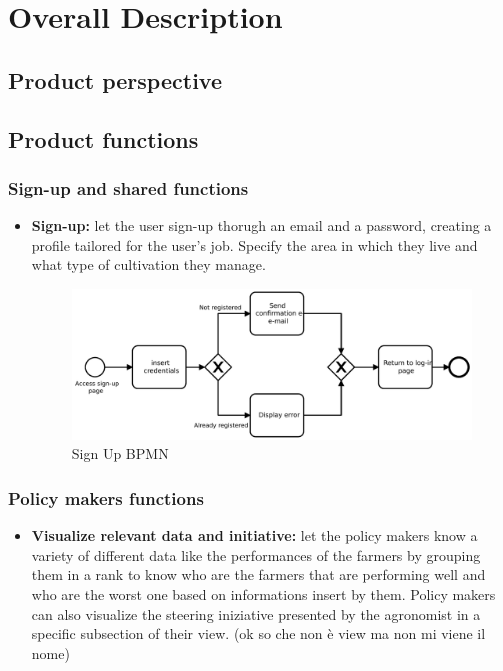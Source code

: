\documentclass[table, 12pt]{article}
\begin{document}
\section{Overall Description}
\subsection{Product perspective}
\subsection{Product functions}
\subsubsection{Sign-up and shared functions}
\begin{itemize}
    \item \textbf{Sign-up:} let the user sign-up thorugh an email and a password, creating a profile tailored for the user's job. Specify the area in which they live and what type of cultivation they manage.
    \begin{center}
        \begin{figure}[!h]
            \includegraphics[width=\textwidth]{assets/SignUpBpmn}
            \caption{Sign Up BPMN}
            \label{fig: singup}
        \end{figure}
    \end{center}
\end{itemize}
\subsubsection{Policy makers functions}
\begin{itemize}                                 
    \item \textbf{Visualize relevant data and initiative: }let the policy makers know a variety of different data like the performances of the farmers by grouping them in a rank to know who are the farmers that are performing well and who are the worst one based on informations insert by them.
    Policy makers can also visualize the steering iniziative presented by the agronomist in a specific subsection of their view. (ok so che non è view ma non mi viene il nome)
\end{itemize}
\end{document}
